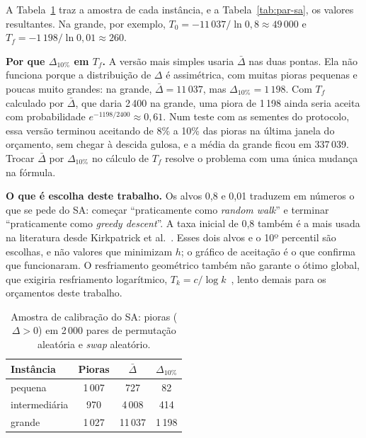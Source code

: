 A Tabela~\ref{tab:calib-sa} traz a amostra de cada instância, e a Tabela~\ref{tab:par-sa}, os valores resultantes. Na grande, por exemplo, $T_0=-11\,037/\ln 0{,}8\approx49\,000$ e $T_f=-1\,198/\ln 0{,}01\approx260$.

\textbf{Por que $\Delta_{10\%}$ em $T_f$.} A versão mais simples usaria $\bar\Delta$ nas duas pontas. Ela não funciona porque a distribuição de $\Delta$ é assimétrica, com muitas pioras pequenas e poucas muito grandes: na grande, $\bar\Delta=11\,037$, mas $\Delta_{10\%}=1\,198$. Com $T_f$ calculado por $\bar\Delta$, que daria 2\,400 na grande, uma piora de 1\,198 ainda seria aceita com probabilidade $e^{-1198/2400}\approx0{,}61$. Num teste com as sementes do protocolo, essa versão terminou aceitando de 8\% a 10\% das pioras na última janela do orçamento, sem chegar à descida gulosa, e a média da grande ficou em 337\,039. Trocar $\bar\Delta$ por $\Delta_{10\%}$ no cálculo de $T_f$ resolve o problema com uma única mudança na fórmula.

\textbf{O que é escolha deste trabalho.} Os alvos 0{,}8 e 0{,}01 traduzem em números o que se pede do SA: começar ``praticamente como \textit{random walk}'' e terminar ``praticamente como \textit{greedy descent}''. A taxa inicial de 0{,}8 também é a mais usada na literatura desde Kirkpatrick et al.~\cite{kirkpatrick1983}. Esses dois alvos e o 10º percentil são escolhas, e não valores que minimizam $h$; o gráfico de aceitação é o que confirma que funcionaram. O resfriamento geométrico também não garante o ótimo global, que exigiria resfriamento logarítmico, $T_k=c/\log k$~\cite{geman1984,hajek1988}, lento demais para os orçamentos deste trabalho.

\begin{table}[H]
\centering
\caption{Amostra de calibração do SA: pioras ($\Delta>0$) em 2\,000 pares de permutação aleatória e \textit{swap} aleatório.}
\label{tab:calib-sa}
\small
\begin{tabular}{lccc}
\toprule
Instância & Pioras & $\bar\Delta$ & $\Delta_{10\%}$\\
\midrule
pequena       & 1\,007 & 727     & 82\\
intermediária & 970    & 4\,008  & 414\\
grande        & 1\,027 & 11\,037 & 1\,198\\
\bottomrule
\end{tabular}
\end{table}

